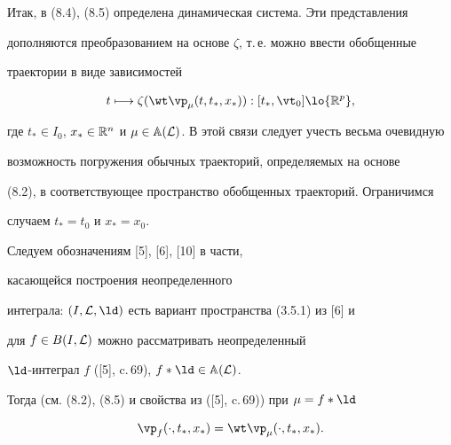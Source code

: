 Итак, в (8.4), (8.5) определена динамическая система. Эти представления


дополняются преобразованием на основе $\zeta$, т.\,е. можно ввести обобщенные


траектории в виде зависимостей


\begin{equation}


t \longmapsto {\zeta}({{\wt \vp}_\mu}(t,{t_*},{x_*})):


[{t_*},{{\vt}_0}] \lo {{\Bbb R}^p},


\end{equation}


где ${t_*} \in {I_0}$, ${x_*} \in {{\Bbb R}^n}$ и $\mu \in


{{\Bbb A}({\cal L})}$. В этой связи следует учесть весьма очевидную


возможность погружения обычных траекторий, определяемых на основе


(8.2), в соответствующее пространство обобщенных траекторий. Ограничимся


случаем ${t_*} = {t_0}$ и ${x_*} = {x_0}$.


Следуем обозначениям [5], [6], [10] в части,


касающейся построения неопределенного


интеграла: $(I,{\cal L},\ld)$ есть вариант пространства (3.5.1) из [6] и


для $f \in B(I,{\cal L})$ можно рассматривать неопределенный


$\ld$-интеграл $f$ ([5], c.\,69), $f*\ld \in {{\Bbb A}({\cal L})}$.


Тогда (см. (8.2), (8.5) и свойства из ([5], c.\,69)) при $\mu = f*\ld$


\begin{equation}


{{\vp}_f}(\cdot,{t_*},{x_*}) = {{\wt \vp}_\mu}(\cdot,{t_*},{x_*}).


\end{equation}





